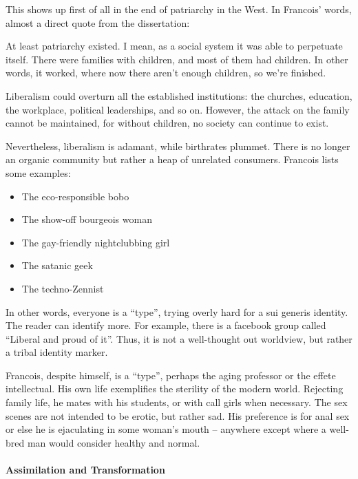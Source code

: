 This shows up first of all in the end of patriarchy in the West. In Francois' words, almost a direct quote from the dissertation:

\begin{quotex}
At least patriarchy existed. I mean, as a social system it was able to perpetuate itself. There were families with children, and most of them had children. In other words, it worked, where now there aren't enough children, so we're finished.
\end{quotex}


Liberalism could overturn all the established institutions: the churches, education, the workplace, political leaderships, and so on. However, the attack on the family cannot be maintained, for without children, no society can continue to exist.

Nevertheless, liberalism is adamant, while birthrates plummet. There is no longer an organic community but rather a heap of unrelated consumers. Francois lists some examples:

\begin{itemize}


\item The eco-responsible bobo

\item The show-off bourgeois woman

\item The gay-friendly nightclubbing girl

\item The satanic geek

\item The techno-Zennist
\end{itemize}


In other words, everyone is a ``type'', trying overly hard for a sui generis identity. The reader can identify more. For example, there is a facebook group called ``Liberal and proud of it''. Thus, it is not a well-thought out worldview, but rather a tribal identity marker.

Francois, despite himself, is a ``type'', perhaps the aging professor or the effete intellectual. His own life exemplifies the sterility of the modern world. Rejecting family life, he mates with his students, or with call girls when necessary. The sex scenes are not intended to be erotic, but rather sad. His preference is for anal sex or else he is ejaculating in some woman's mouth -- anywhere except where a well-bred man would consider healthy and normal.

\paragraph{Assimilation and Transformation}


